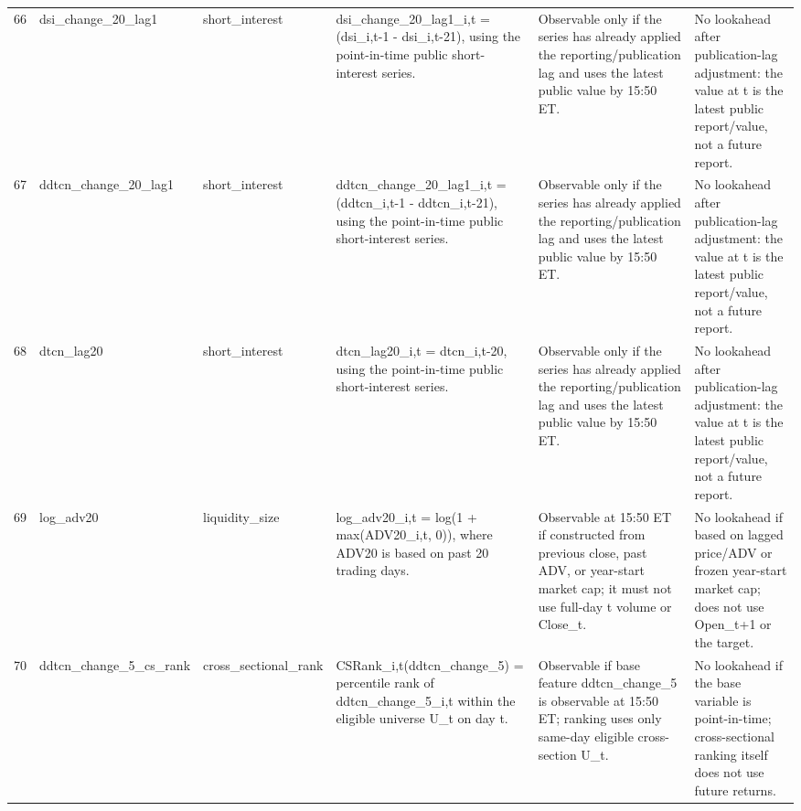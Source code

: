\begin{landscape}
\begin{longtable}{P{0.42cm} P{2.25cm} P{2.05cm} P{5.25cm} P{4.85cm} P{5.25cm}}
66 & dsi\_\allowbreak{}change\_\allowbreak{}20\_\allowbreak{}lag1 & short\_\allowbreak{}interest & dsi\_\allowbreak{}change\_\allowbreak{}20\_\allowbreak{}lag1\_\allowbreak{}i,t = (dsi\_\allowbreak{}i,t-1 - dsi\_\allowbreak{}i,t-21), using the point-in-time public short-interest series. & Observable only if the series has already applied the reporting/publication lag and uses the latest public value by 15:50 ET. & No lookahead after publication-lag adjustment: the value at t is the latest public report/value, not a future report. \\
67 & ddtcn\_\allowbreak{}change\_\allowbreak{}20\_\allowbreak{}lag1 & short\_\allowbreak{}interest & ddtcn\_\allowbreak{}change\_\allowbreak{}20\_\allowbreak{}lag1\_\allowbreak{}i,t = (ddtcn\_\allowbreak{}i,t-1 - ddtcn\_\allowbreak{}i,t-21), using the point-in-time public short-interest series. & Observable only if the series has already applied the reporting/publication lag and uses the latest public value by 15:50 ET. & No lookahead after publication-lag adjustment: the value at t is the latest public report/value, not a future report. \\
68 & dtcn\_\allowbreak{}lag20 & short\_\allowbreak{}interest & dtcn\_\allowbreak{}lag20\_\allowbreak{}i,t = dtcn\_\allowbreak{}i,t-20, using the point-in-time public short-interest series. & Observable only if the series has already applied the reporting/publication lag and uses the latest public value by 15:50 ET. & No lookahead after publication-lag adjustment: the value at t is the latest public report/value, not a future report. \\
69 & log\_\allowbreak{}adv20 & liquidity\_\allowbreak{}size & log\_\allowbreak{}adv20\_\allowbreak{}i,t = log(1 + max(ADV20\_\allowbreak{}i,t, 0)), where ADV20 is based on past 20 trading days. & Observable at 15:50 ET if constructed from previous close, past ADV, or year-start market cap; it must not use full-day t volume or Close\_\allowbreak{}t. & No lookahead if based on lagged price/ADV or frozen year-start market cap; does not use Open\_\allowbreak{}t+1 or the target. \\
70 & ddtcn\_\allowbreak{}change\_\allowbreak{}5\_\allowbreak{}cs\_\allowbreak{}rank & cross\_\allowbreak{}sectional\_\allowbreak{}rank & CSRank\_\allowbreak{}i,t(ddtcn\_\allowbreak{}change\_\allowbreak{}5) = percentile rank of ddtcn\_\allowbreak{}change\_\allowbreak{}5\_\allowbreak{}i,t within the eligible universe U\_\allowbreak{}t on day t. & Observable if base feature ddtcn\_\allowbreak{}change\_\allowbreak{}5 is observable at 15:50 ET; ranking uses only same-day eligible cross-section U\_\allowbreak{}t. & No lookahead if the base variable is point-in-time; cross-sectional ranking itself does not use future returns. \\

\end{longtable}
\end{landscape}
